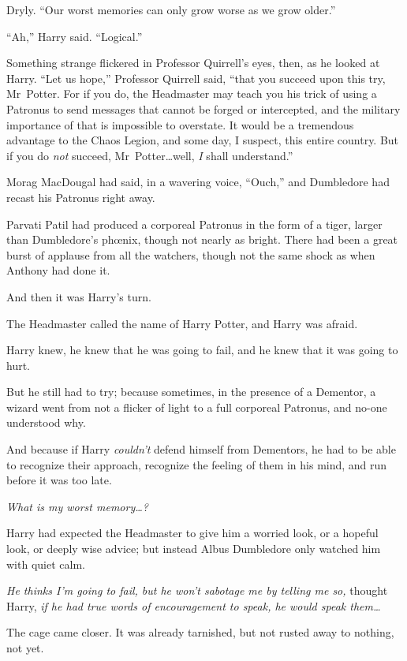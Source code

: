 Dryly. “Our worst memories can only grow worse as we grow older.”

“Ah,” Harry said. “Logical.”

Something strange flickered in Professor Quirrell’s eyes, then, as he looked at Harry. “Let us hope,” Professor Quirrell said, “that you succeed upon this try, Mr~Potter. For if you do, the Headmaster may teach you his trick of using a Patronus to send messages that cannot be forged or intercepted, and the military importance of that is impossible to overstate. It would be a tremendous advantage to the Chaos Legion, and some day, I suspect, this entire country. But if you do \emph{not} succeed, Mr~Potter…well, \emph{I} shall understand.”

\later

Morag MacDougal had said, in a wavering voice, “Ouch,” and Dumbledore had recast his Patronus right away.

Parvati Patil had produced a corporeal Patronus in the form of a tiger, larger than Dumbledore’s phœnix, though not nearly as bright. There had been a great burst of applause from all the watchers, though not the same shock as when Anthony had done it.

And then it was Harry’s turn.

The Headmaster called the name of Harry Potter, and Harry was afraid.

Harry knew, he knew that he was going to fail, and he knew that it was going to hurt.

But he still had to try; because sometimes, in the presence of a Dementor, a wizard went from not a flicker of light to a full corporeal Patronus, and no-one understood why.

And because if Harry \emph{couldn’t} defend himself from Dementors, he had to be able to recognize their approach, recognize the feeling of them in his mind, and run before it was too late.

\emph{What is my worst memory…?}

Harry had expected the Headmaster to give him a worried look, or a hopeful look, or deeply wise advice; but instead Albus Dumbledore only watched him with quiet calm.

\emph{He thinks I’m going to fail, but he won’t sabotage me by telling me so,} thought Harry, \emph{if he had true words of encouragement to speak, he would speak them…}

The cage came closer. It was already tarnished, but not rusted away to nothing, not yet.

